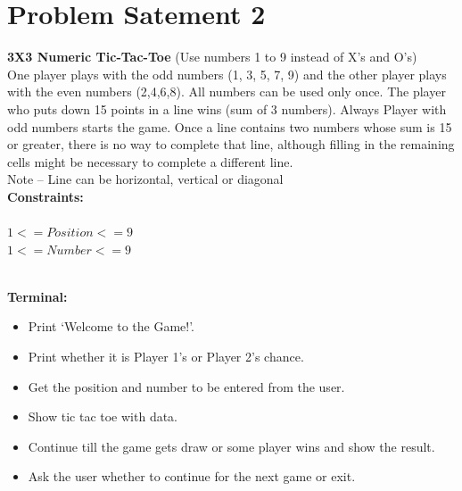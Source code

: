 \documentclass{article}
\begin{document}
    \section{Problem Satement 2}
    \textbf{3X3 Numeric Tic-Tac-Toe} (Use numbers 1 to 9 instead of X’s and O’s)
    \\One player plays with the odd numbers (1, 3, 5, 7, 9) and the other player plays with the even numbers (2,4,6,8). All numbers can be used only once. The player who puts down 15 points in a line wins (sum of 3 numbers). Always Player with odd numbers starts the game. Once a line contains two numbers whose sum is 15 or greater, there is no way to complete that line, although filling in the remaining cells might be necessary to complete a different line.
    \\Note – Line can be horizontal, vertical or diagonal\\

    \textbf{Constraints:\\}
    \\$1<=Position<=9$
    \\$1<=Number<=9$

    \textbf{\\Terminal:}
    \begin{itemize}
        \item Print ‘Welcome to the Game!’.	
        \item Print whether it is Player 1’s or Player 2’s chance.
        \item Get the position and number to be entered from the user.
        \item Show tic tac toe with data.
        \item Continue till the game gets draw or some player wins and show the result.
        \item Ask the user whether to continue for the next game or exit.
    \end{itemize}
\end{document}
